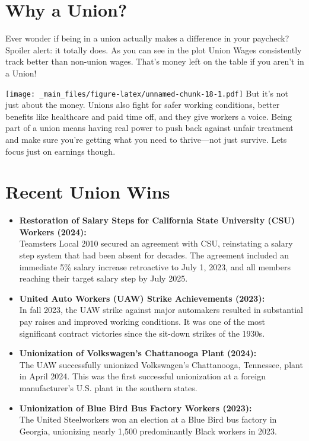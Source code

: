 \documentclass[
]{book}
\theoremstyle{definition}
\theoremstyle{definition}
\theoremstyle{definition}
\theoremstyle{definition}
\theoremstyle{remark}
\begin{document}
\section{Why a Union?}\label{why-a-union}

Ever wonder if being in a union actually makes a difference in your paycheck? Spoiler alert: it totally does. As you can see in the plot Union Wages consistently track better than non-union wages. That's money left on the table if you aren't in a Union!

\texttt{[image: \_main\_files/figure-latex/unnamed-chunk-18-1.pdf]}
But it's not just about the money. Unions also fight for safer working conditions, better benefits like healthcare and paid time off, and they give workers a voice. Being part of a union means having real power to push back against unfair treatment and make sure you're getting what you need to thrive---not just survive. Lets focus just on earnings though.

\section{Recent Union Wins}\label{recent-union-wins}

\begin{itemize}
\item
  \textbf{Restoration of Salary Steps for California State University (CSU) Workers (2024):}\\
  Teamsters Local 2010 secured an agreement with CSU, reinstating a salary step system that had been absent for decades. The agreement included an immediate 5\% salary increase retroactive to July 1, 2023, and all members reaching their target salary step by July 2025.\citep{teamsters2024}
\item
  \textbf{United Auto Workers (UAW) Strike Achievements (2023):}\\
  In fall 2023, the UAW strike against major automakers resulted in substantial pay raises and improved working conditions. It was one of the most significant contract victories since the sit-down strikes of the 1930s. \citep{thenation2023}
\item
  \textbf{Unionization of Volkswagen's Chattanooga Plant (2024):}\\
  The UAW successfully unionized Volkswagen's Chattanooga, Tennessee, plant in April 2024. This was the first successful unionization at a foreign manufacturer's U.S. plant in the southern states. \citep{lemonde2024}
\item
  \textbf{Unionization of Blue Bird Bus Factory Workers (2023):}\\
  The United Steelworkers won an election at a Blue Bird bus factory in Georgia, unionizing nearly 1,500 predominantly Black workers in 2023.
\end{itemize}
\end{document}
